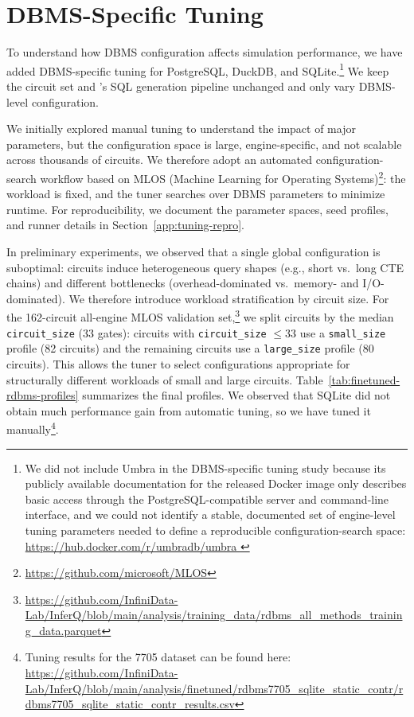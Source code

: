 \section{DBMS-Specific Tuning}
\label{app:finetuned-rdbms}

To understand how DBMS configuration affects simulation performance, we have added
DBMS-specific tuning for PostgreSQL, DuckDB, and SQLite.\footnote{We did not include Umbra in the DBMS-specific tuning study because its publicly available documentation for the released Docker image only describes basic access through the PostgreSQL-compatible server and command-line interface, and we could not identify a stable, documented set of engine-level tuning parameters needed to define a reproducible configuration-search space: \url{https://hub.docker.com/r/umbradb/umbra }} We keep the circuit set and
\sys’s SQL generation pipeline unchanged and only vary DBMS-level configuration.

\medskip
{}
We initially explored manual tuning to understand the impact of major parameters, but the
configuration space is large, engine-specific, and not scalable across thousands of
circuits. We therefore adopt an automated configuration-search workflow based on MLOS
(Machine Learning for Operating Systems)\footnote{\url{https://github.com/microsoft/MLOS}}:
the workload is fixed, and the tuner searches over DBMS parameters to minimize runtime.
For reproducibility, we document the parameter spaces, seed profiles, and runner details in
Section~\ref{app:tuning-repro}.

\medskip
{}
In preliminary experiments, we observed that a single global configuration is suboptimal:
circuits induce heterogeneous query shapes (e.g., short vs.\ long CTE chains) and
different bottlenecks (overhead-dominated vs.\ memory- and I/O-dominated). We therefore
introduce workload stratification by circuit size. For the 162-circuit all-engine MLOS
validation set,\footnote{\url{https://github.com/InfiniData-Lab/InferQ/blob/main/analysis/training_data/rdbms_all_methods_training_data.parquet}}
we split circuits by the median \texttt{circuit\_size} (33 gates): circuits with
\texttt{circuit\_size} $\le 33$ use a \texttt{small\_size} profile (82 circuits) and the
remaining circuits use a \texttt{large\_size} profile (80 circuits). This allows the tuner
to select configurations appropriate for structurally different workloads of small and large circuits.
Table~\ref{tab:finetuned-rdbms-profiles} summarizes the final
profiles. We observed that SQLite did not obtain much performance gain from automatic tuning, so we have tuned it manually\footnote{Tuning results for the 7705 dataset can be found here: \url{https://github.com/InfiniData-Lab/InferQ/blob/main/analysis/finetuned/rdbms7705_sqlite_static_contr/rdbms7705_sqlite_static_contr_results.csv}}.


